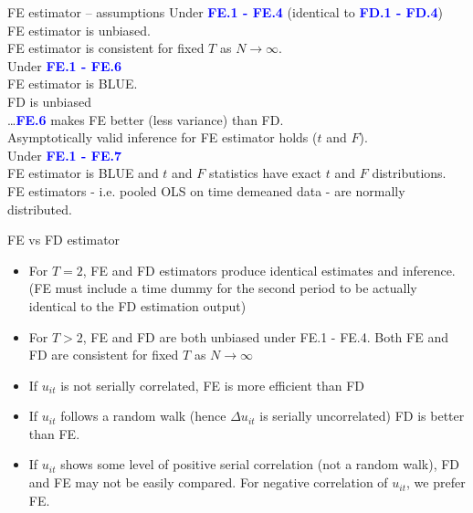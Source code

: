 \documentclass{beamer}
\begin{document}
\begin{frame}{FE estimator – assumptions}
Under \textcolor{blue}{\textbf{FE.1 - FE.4}} (identical to  \textcolor{blue}{\textbf{FD.1 - FD.4}})\\
FE estimator is unbiased. \\
FE estimator is consistent for fixed $T$ as $N \rightarrow \infty$.\\
\vspace{0.5cm}
Under \textcolor{blue}{\textbf{FE.1 - FE.6}}\\
FE estimator is BLUE.\\
FD is unbiased\\ \dots  \textcolor{blue}{\textbf{FE.6}} makes FE better (less variance) than FD.\\
Asymptotically valid inference for FE estimator holds ($t$ and $F$).\\
\vspace{0.5cm}
Under  \textcolor{blue}{\textbf{FE.1 - FE.7}}\\
FE estimator is BLUE and $t$ and $F$ statistics have exact $t$ and $F$ distributions.\\
FE estimators - i.e. pooled OLS on time demeaned data - are normally distributed.
\end{frame}
\begin{frame}{FE vs FD estimator}
\begin{itemize}
\item For $T=2$, FE and FD estimators produce identical estimates and inference. (FE must include a time dummy for the second period to be actually identical to the FD estimation output)
\item For $T>2$, FE and FD are both unbiased under FE.1 - FE.4. Both FE and FD are consistent for fixed $T$ as $N \rightarrow \infty$
\item If $u_{it}$ is not serially correlated, FE is more efficient than FD
\item If $u_{it}$ follows a random walk (hence $\Delta u_{it}$ is serially uncorrelated) FD is better than FE.
\item If $u_{it}$ shows some level of positive serial correlation (not a random walk), FD and FE may not be easily compared. For negative correlation of $u_{it}$, we prefer FE.
\end{itemize}
\end{frame}
\end{document}
